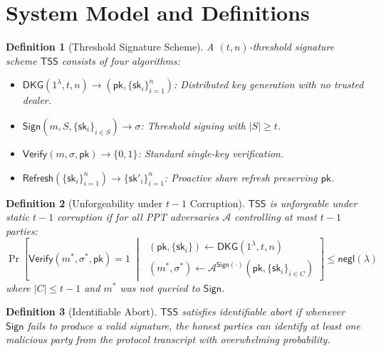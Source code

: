 \documentclass[11pt,twocolumn]{article}
\newtheorem{definition}{Definition}[section]
\begin{document}
\section{System Model and Definitions}
\label{sec:model}

\begin{definition}[Threshold Signature Scheme]
\label{def:tss}
A $(t,n)$-threshold signature scheme $\mathsf{TSS}$ consists of four algorithms:
\begin{itemize}[nosep]
  \item $\mathsf{DKG}(1^\lambda, t, n) \to (\mathsf{pk}, \{\mathsf{sk}_i\}_{i=1}^n)$:
    Distributed key generation with no trusted dealer.
  \item $\mathsf{Sign}(m, S, \{\mathsf{sk}_i\}_{i \in S}) \to \sigma$: Threshold
    signing with $|S| \geq t$.
  \item $\mathsf{Verify}(m, \sigma, \mathsf{pk}) \to \{0,1\}$: Standard single-key
    verification.
  \item $\mathsf{Refresh}(\{\mathsf{sk}_i\}_{i=1}^n) \to \{\mathsf{sk}'_i\}_{i=1}^n$:
    Proactive share refresh preserving $\mathsf{pk}$.
\end{itemize}
\end{definition}

\begin{definition}[Unforgeability under $t{-}1$ Corruption]
\label{def:uf}
$\mathsf{TSS}$ is unforgeable under static $t{-}1$ corruption if for all PPT
adversaries $\mathcal{A}$ controlling at most $t-1$ parties:
\[
  \Pr\!\left[
    \mathsf{Verify}(m^*, \sigma^*, \mathsf{pk}) = 1
    \;\middle|\;
    \begin{array}{l}
      (\mathsf{pk}, \{\mathsf{sk}_i\}) \gets \mathsf{DKG}(1^\lambda, t, n) \\
      (m^*, \sigma^*) \gets \mathcal{A}^{\mathsf{Sign}(\cdot)}(\mathsf{pk}, \{\mathsf{sk}_i\}_{i \in C})
    \end{array}
  \right] \leq \mathsf{negl}(\lambda)
\]
where $|C| \leq t-1$ and $m^*$ was not queried to $\mathsf{Sign}$.
\end{definition}

\begin{definition}[Identifiable Abort]
\label{def:id-abort}
$\mathsf{TSS}$ satisfies identifiable abort if whenever $\mathsf{Sign}$ fails to
produce a valid signature, the honest parties can identify at least one malicious
party from the protocol transcript with overwhelming probability.
\end{definition}
\end{document}
